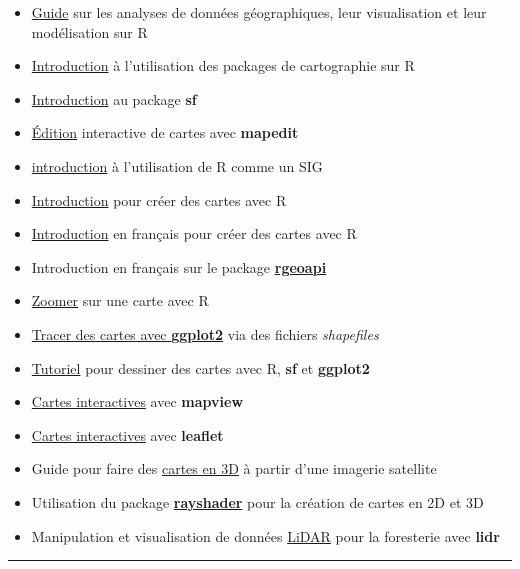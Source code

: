 \documentclass[
]{book}
\providecommand{\tightlist}{%
  \setlength{\itemsep}{0pt}\setlength{\parskip}{0pt}}
\begin{document}
\begin{itemize}
\tightlist
\item
  \href{https://geocompr.robinlovelace.net/}{Guide} sur les analyses de données
  géographiques, leur visualisation et leur modélisation sur R
\item
  \href{https://statnmap.com/2018-07-14-introduction-to-mapping-with-sf-and-co/}{Introduction}
  à l'utilisation des packages de cartographie sur R
\item
  \href{https://www.infoworld.com/article/3505897/how-to-do-spatial-analysis-in-r-with-sf.amp.html}{Introduction}
  au package \textbf{sf}
\item
  \href{https://github.com/r-spatial/mapedit}{Édition} interactive de cartes avec
  \textbf{mapedit}
\item
  \href{https://mhallwor.github.io/_pages/welcome}{introduction} à l'utilisation de R
  comme un SIG
\item
  \href{http://eriqande.github.io/rep-res-web/lectures/making-maps-with-R.html}{Introduction}
  pour créer des cartes avec R
\item
  \href{https://thinkr.fr/sil-te-plait-dessine-moi-carte-r/}{Introduction}
  en français pour créer des cartes avec R
\item
  Introduction en français sur le package
  \href{https://colinfay.me/carte-r-rgeoapi-ggplot2/}{\textbf{rgeoapi}}
\item
  \href{https://rgeomatic.hypotheses.org/tag/sf}{Zoomer} sur une carte avec R
\item
  \href{https://rpubs.com/huanfaChen/ggplotShapefile}{Tracer des cartes avec \textbf{ggplot2}}
  via des fichiers \emph{shapefiles}
\item
  \href{https://www.r-spatial.org/r/2018/10/25/ggplot2-sf.html}{Tutoriel}
  pour dessiner des cartes avec R, \textbf{sf} et \textbf{ggplot2}
\item
  \href{https://r-spatial.github.io/mapview/}{Cartes interactives} avec \textbf{mapview}
\item
  \href{https://rstudio.github.io/leaflet/}{Cartes interactives} avec \textbf{leaflet}
\item
  Guide pour faire des
  \href{https://www.tylermw.com/a-step-by-step-guide-to-making-3d-maps-with-satellite-imagery-in-r/}{cartes en 3D}
  à partir d'une imagerie satellite
\item
  Utilisation du package \href{https://www.rayshader.com/}{\textbf{rayshader}} pour la
  création de cartes en 2D et 3D
\item
  Manipulation et visualisation de données
  \href{https://github.com/Jean-Romain/lidR}{LiDAR} pour la foresterie avec \textbf{lidr}
\end{itemize}

\begin{center}\rule{0.5\linewidth}{0.5pt}\end{center}

  
\end{document}
